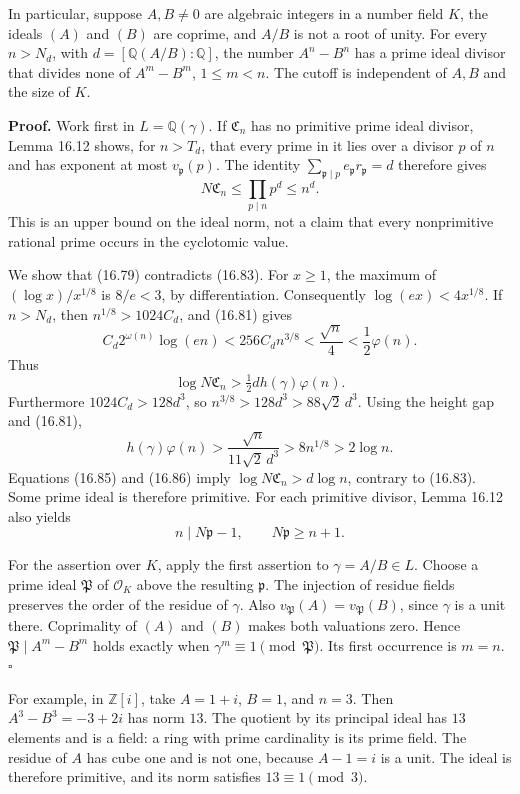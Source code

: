 \documentclass[
  11pt,
  a4paper,
]{article}
\begin{document}
In particular, suppose \(A,B\ne0\) are algebraic integers in a number
field \(K\), the ideals \((A)\) and \((B)\) are coprime, and \(A/B\) is
not a root of unity. For every \(n>N_d\), with
\(d=[\mathbb Q(A/B):\mathbb Q]\), the number \(A^n-B^n\) has a prime
ideal divisor that divides none of \(A^m-B^m\), \(1\le m<n\). The cutoff
is independent of \(A,B\) and the size of \(K\).

\textbf{Proof.} Work first in \(L=\mathbb Q(\gamma)\). If
\(\mathfrak C_n\) has no primitive prime ideal divisor, Lemma 16.12
shows, for \(n>T_d\), that every prime in it lies over a divisor \(p\)
of \(n\) and has exponent at most \(v_{\mathfrak p}(p)\). The identity
\(\sum_{\mathfrak p\mid p}e_{\mathfrak p}r_{\mathfrak p}=d\) therefore
gives \[
 N\mathfrak C_n\le\prod_{p\mid n}p^d\le n^d.
 \tag{16.83}
\] This is an upper bound on the ideal norm, not a claim that every
nonprimitive rational prime occurs in the cyclotomic value.

We show that (16.79) contradicts (16.83). For \(x\ge1\), the maximum of
\((\log x)/x^{1/8}\) is \(8/e<3\), by differentiation. Consequently
\(\log(ex)<4x^{1/8}\). If \(n>N_d\), then \(n^{1/8}>1024C_d\), and
(16.81) gives \[
 C_d2^{\omega(n)}\log(en)
 <256C_dn^{3/8}
 <\frac{\sqrt n}{4}
 <\frac12\varphi(n).
 \tag{16.84}
\] Thus \[
 \log N\mathfrak C_n>\tfrac12dh(\gamma)\varphi(n).
 \tag{16.85}
\] Furthermore \(1024C_d>128d^3\), so \(n^{3/8}>128d^3>88\sqrt2\,d^3\).
Using the height gap and (16.81), \[
 h(\gamma)\varphi(n)>
 \frac{\sqrt n}{11\sqrt2\,d^3}
 {}>8n^{1/8}>2\log n.
 \tag{16.86}
\] Equations (16.85) and (16.86) imply \(\log N\mathfrak C_n>d\log n\),
contrary to (16.83). Some prime ideal is therefore primitive. For each
primitive divisor, Lemma 16.12 also yields \[
 n\mid N\mathfrak p-1,\qquad N\mathfrak p\ge n+1.
 \tag{16.87}
\]

For the assertion over \(K\), apply the first assertion to
\(\gamma=A/B\in L\). Choose a prime ideal \(\mathfrak P\) of
\(\mathcal O_K\) above the resulting \(\mathfrak p\). The injection of
residue fields preserves the order of the residue of \(\gamma\). Also
\(v_{\mathfrak P}(A)=v_{\mathfrak P}(B)\), since \(\gamma\) is a unit
there. Coprimality of \((A)\) and \((B)\) makes both valuations zero.
Hence \(\mathfrak P\mid A^m-B^m\) holds exactly when
\(\gamma^m\equiv1\pmod{\mathfrak P}\). Its first occurrence is \(m=n\).
\(\square\)

For example, in \(\mathbb Z[i]\), take \(A=1+i\), \(B=1\), and \(n=3\).
Then \(A^3-B^3=-3+2i\) has norm \(13\). The quotient by its principal
ideal has \(13\) elements and is a field: a ring with prime cardinality
is its prime field. The residue of \(A\) has cube one and is not one,
because \(A-1=i\) is a unit. The ideal is therefore primitive, and its
norm satisfies \(13\equiv1\pmod3\).
\end{document}
